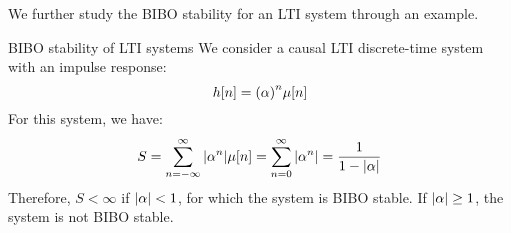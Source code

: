 \documentclass[../../main/main.tex]{subfiles}
\begin{document}
We further study the BIBO stability for an LTI system through an example.

\begin{example}{BIBO stability of LTI systems}{}
    We consider a causal LTI discrete-time system with an impulse response:
    \begin{equation}
        h[n]
        =
        \qty(\alpha)^{n} \mu[n]
        \label{eq:L06_S07_1}
    \end{equation}
    For this system, we have:
    \begin{equation}
        S
        =
        \sum_{n = -\infty}^{\infty} \abs{\alpha^{n}} \mu[n]
        =
        \sum_{n = 0}^{\infty} \abs{\alpha^{n}}
        =
        \frac{1}{1 - \abs{\alpha}}
        \label{eq:L06_S07_2}
    \end{equation}
    Therefore, \( S < \infty \) if \( \abs{\alpha} < 1 \), for which the system is BIBO stable. If \( \abs{\alpha} \ge 1 \), the system is not BIBO stable.
\end{example}
\end{document}
